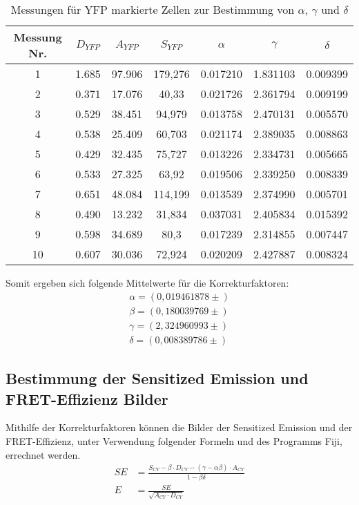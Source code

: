 \begin{table}[h]
    \centering
    \begin{tabular}{c|c|c|c|c|c|c}
         Messung Nr. &  $D_{YFP}$ & $A_{YFP}$ & $S_{YFP}$ &     $\alpha$ &     $\gamma$ &     $\delta$ \\\hline\hline
               1 &  1.685 &  97.906 &     179,276 &  0.017210 &  1.831103 &  0.009399 \\\hline
               2 &  0.371 &  17.076 &       40,33 &  0.021726 &  2.361794 &  0.009199 \\\hline
               3 &  0.529 &  38.451 &      94,979 &  0.013758 &  2.470131 &  0.005570 \\\hline
               4 &  0.538 &  25.409 &      60,703 &  0.021174 &  2.389035 &  0.008863 \\\hline
               5 &  0.429 &  32.435 &      75,727 &  0.013226 &  2.334731 &  0.005665 \\\hline
               6 &  0.533 &  27.325 &       63,92 &  0.019506 &  2.339250 &  0.008339 \\\hline
               7 &  0.651 &  48.084 &     114,199 &  0.013539 &  2.374990 &  0.005701 \\\hline
               8 &  0.490 &  13.232 &      31,834 &  0.037031 &  2.405834 &  0.015392 \\\hline
               9 &  0.598 &  34.689 &        80,3 &  0.017239 &  2.314855 &  0.007447 \\\hline
              10 &  0.607 &  30.036 &      72,924 &  0.020209 &  2.427887 &  0.008324 \\\hline
        \end{tabular}
    \caption{Messungen für YFP markierte Zellen zur Bestimmung von $\alpha$, $\gamma$ und $\delta$}
\end{table}

Somit ergeben sich folgende Mittelwerte für die Korrekturfaktoren: 
\begin{align}
    \alpha = (0,019461878 \pm )\\
    \beta = (0,180039769 \pm )\\
    \gamma = (2,324960993 \pm )\\
    \delta = (0,008389786 \pm )
\end{align}

\newpage
\subsection{Bestimmung der Sensitized Emission und FRET-Effizienz Bilder}

Mithilfe der Korrekturfaktoren können die Bilder der Sensitized Emission und der FRET-Effizienz, unter Verwendung folgender Formeln und des Programms Fiji, errechnet werden.
\begin{align}
    SE &= \frac{S_{CY} - \beta \cdot D_{CY} - (\gamma -\alpha \beta)\cdot A_{CY}}{1 - \beta \delta} \\
    E &= \frac{SE}{\sqrt{A_{CY} \cdot D_{CY}}}
\end{align}